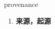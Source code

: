 
\begin{frame}
{\huge provenance}
\begin{center}
\begin{enumerate}\Large
  \item \textbf{来源，起源}
\end{enumerate}
\end{center}
\end{frame}
